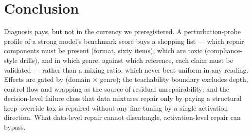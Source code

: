 \section{Conclusion}
\label{sec:conclusion}

Diagnosis pays, but not in the currency we preregistered. A perturbation-probe
profile of a strong model's benchmark score buys a shopping list --- which
repair components must be present (format, sixty items), which are toxic
(compliance-style drills), and in which genre, against which reference, each
claim must be validated --- rather than a mixing ratio, which never beat
uniform in any reading. Effects are gated by (domain $\times$ genre); the
teachability boundary excludes depth, control flow and wrapping as the source
of residual unrepairability; and the decision-level failure class that data
mixtures repair only by paying a structural keep--override tax is repaired
without any fine-tuning by a single activation direction. What data-level repair cannot
disentangle, activation-level repair can bypass.

